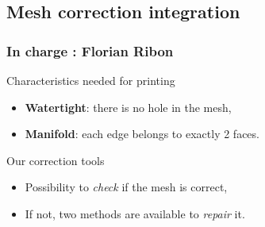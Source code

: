 \documentclass{beamer}
\begin{document}
\subsection{Mesh correction integration}

\begin{frame}
	\frametitle{In charge : Florian Ribon}
    \begin{block}{Characteristics needed for printing}
		\begin{itemize}
		    \item \textbf{Watertight}: there is no hole in the mesh,
            \item \textbf{Manifold}: each edge belongs to exactly 2 faces.
		\end{itemize}
    \end{block}

    \begin{block}{Our correction tools}
		\begin{itemize}
		    \item Possibility to \textit{check} if the mesh is correct,
			\item If not, two methods are available to \textit{repair} it.
		\end{itemize}
    \end{block}

\end{frame}
\end{document}
